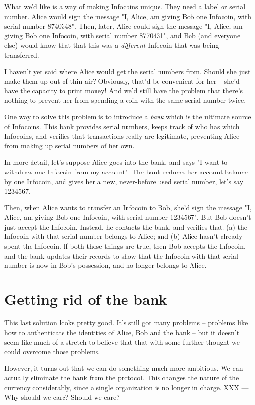 \documentclass[12pt]{book}
\newcounter{problem}[chapter]
\begin{document}
What we'd like is a way of making Infocoins unique.  They need a label
or serial number.  Alice would sign the message "I, Alice, am giving
Bob one Infocoin, with serial number 8740348".  Then, later, Alice
could sign the message "I, Alice, am giving Bob one Infocoin, with
serial number 8770431", and Bob (and everyone else) would know that
that this was a \emph{different} Infocoin that was being transferred.

I haven't yet said where Alice would get the serial numbers from.
Should she just make them up out of thin air?  Obviously, that'd be
convenient for her -- she'd have the capacity to print money!  And
we'd still have the problem that there's nothing to prevent her from
spending a coin with the same serial number twice.

One way to solve this problem is to introduce a \emph{bank} which is
the ultimate source of Infocoins.  This bank provides serial numbers,
keeps track of who has which Infocoins, and verifies that transactions
really are legitimate, preventing Alice from making up serial numbers
of her own.

In more detail, let's suppose Alice goes into the bank, and says "I
want to withdraw one Infocoin from my account".  The bank reduces her
account balance by one Infocoin, and gives her a new, never-before
used serial number, let's say 1234567.

Then, when Alice wants to transfer an Infocoin to Bob, she'd sign the
message "I, Alice, am giving Bob one Infocoin, with serial number
1234567".  But Bob doesn't just accept the Infocoin.  Instead, he
contacts the bank, and verifies that: (a) the Infocoin with that
serial number belongs to Alice; and (b) Alice hasn't already spent the
Infocoin.  If both those things are true, then Bob accepts the
Infocoin, and the bank updates their records to show that the Infocoin
with that serial number is now in Bob's possession, and no longer
belongs to Alice.

\section{Getting rid of the bank}

This last solution looks pretty good.  It's still got many problems --
problems like how to authenticate the identities of Alice, Bob and the
bank -- but it doesn't seem like much of a stretch to believe that
that with some further thought we could overcome those problems.

However, it turns out that we can do something much more ambitious.
We can actually eliminate the bank from the protocol.  This changes
the nature of the currency considerably, since a single organization
is no longer in charge.  XXX --- Why should we care?  Should we care?
\end{document}
